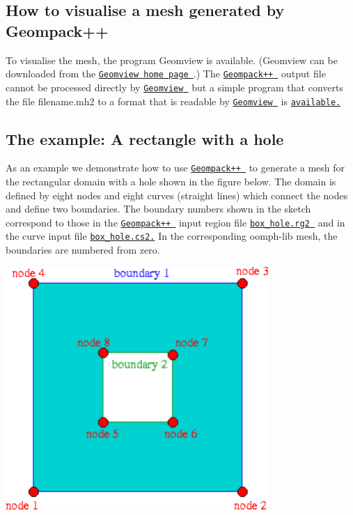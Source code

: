 \hypertarget{index_geomview}{}\subsection{How to visualise a mesh generated by Geompack++}\label{index_geomview}
To visualise the mesh, the program {\ttfamily Geomview} is available. ({\ttfamily Geomview} can be downloaded from the \href{http://www.geomview.org/}{\tt {\ttfamily Geomview} home page }.) The \href{http://members.shaw.ca/bjoe/}{\tt {\ttfamily Geompack++} } output file cannot be processed directly by \href{http://www.geomview.org/}{\tt {\ttfamily Geomview} } but a simple program that converts the file {\ttfamily filename.\+mh2} to a format that is readable by \href{http://www.geomview.org/}{\tt {\ttfamily Geomview} } is \href{../../../../demo_drivers/meshing/mesh_from_geompack/convert_geom_file.cc}{\tt available.}



\hypertarget{index_example}{}\subsection{The example\+: A rectangle with a hole}\label{index_example}
As an example we demonstrate how to use \href{http://members.shaw.ca/bjoe/}{\tt {\ttfamily Geompack++} } to generate a mesh for the rectangular domain with a hole shown in the figure below. The domain is defined by eight nodes and eight curves (straight lines) which connect the nodes and define two boundaries. The boundary numbers shown in the sketch correspond to those in the \href{http://members.shaw.ca/bjoe/}{\tt {\ttfamily Geompack++} } input region file \href{../../../../demo_drivers/meshing/mesh_from_geompack/box_hole.rg2}{\tt box\+\_\+hole.\+rg2 } and in the curve input file \href{../../../../demo_drivers/meshing/mesh_from_geompack/box_hole.cs2}{\tt box\+\_\+hole.\+cs2.} In the corresponding {\ttfamily oomph-\/lib} mesh, the boundaries are numbered from zero.

 
\begin{DoxyImage}
\includegraphics[width=0.75\textwidth]{box_hole_2}
\end{DoxyImage}


